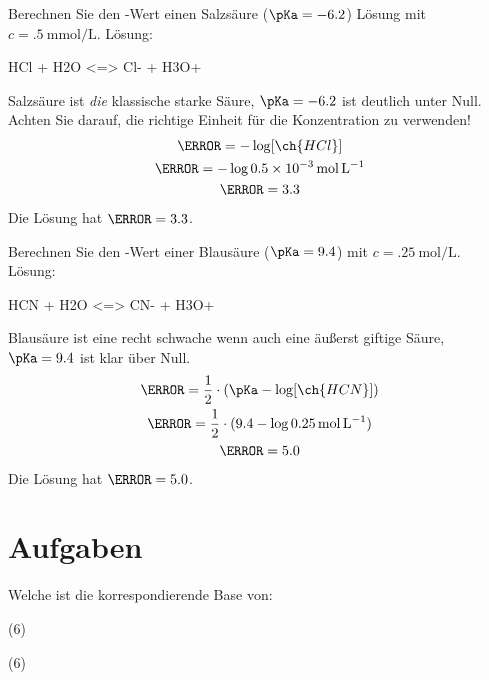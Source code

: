 \documentclass{arbeitsblatt}
\begin{document}
\begin{beispiel}
  Berechnen Sie den \pH-Wert einen Salzsäure (\(\pKa=\num{-6.2}\)) Lösung mit
  \(c = \SI{.5}{\milli\mole\per\liter}\).
  \noindent Lösung:
  \begin{reaction*}
    HCl + H2O <=> Cl- + H3O+
  \end{reaction*}
  Salzsäure ist \emph{die} klassische starke Säure, \(\pKa=\num{-6.2}\) ist
  deutlich unter Null.  Achten Sie darauf, die richtige Einheit für die
  Konzentration zu verwenden!
  \begin{gather*}
    \pH = -\log [\ch{HCl}] \\
    \pH = -\log \SI{.5e-3}{\mole\per\liter} \\
    \pH = \num{3.3}
  \end{gather*}
  Die Lösung hat \(\pH = \num{3.3}\).
\end{beispiel}

\begin{beispiel}
  Berechnen Sie den \pH-Wert einer Blausäure (\(\pKa = \num{9.4}\)) mit \(c =
  \SI{.25}{\mole\per\liter}\).
  \noindent Lösung:
  \begin{reaction*}
    HCN + H2O <=> CN- + H3O+
  \end{reaction*}
  Blausäure ist eine recht schwache wenn auch eine äußerst giftige Säure,
  \(\pKa=\num{9.4}\) ist klar über Null.
  \begin{gather*}
    \pH = \frac{1}{2}\cdot(\pKa - \log [\ch{HCN}]) \\
    \pH = \frac{1}{2}\cdot(9.4 - \log \SI{.25}{\mole\per\liter}) \\
    \pH = \num{5.0}
  \end{gather*}
  Die Lösung hat \(\pH = \num{5.0}\).
\end{beispiel}

\newpage
\section{Aufgaben}
\begin{question}
  Welche ist die korrespondierende Base von:
  \begin{tasks}(6)
    \task {}
    \task {}
    \task {}
    \task {}
    \task {}
    \task {}
  \end{tasks}
\end{question}
\begin{solution}
  \begin{tasks}(6)
    \task {}
    \task {}
    \task {}
    \task {}
    \task {}
    \task {}
  \end{tasks}
\end{solution}
\end{document}
